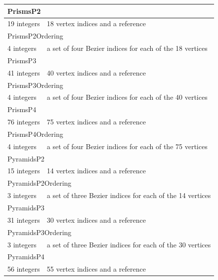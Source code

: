 \documentclass[a4paper,12pt]{article}
\begin{document}
\begin{longtable}{|m{4cm}|m{11cm}|}
\multicolumn{2}{|l|}{PrismsP2} \\
\hline
19 integers & 18 vertex indices and a reference \\
\hline\hline

\multicolumn{2}{|l|}{PrismsP2Ordering} \\
\hline
4 integers & a set of four Bezier indices for each of the 18 vertices \\
\hline\hline

\multicolumn{2}{|l|}{PrismsP3} \\
\hline
41 integers & 40 vertex indices and a reference \\
\hline\hline

\multicolumn{2}{|l|}{PrismsP3Ordering} \\
\hline
4 integers & a set of four Bezier indices for each of the 40 vertices \\
\hline\hline

\multicolumn{2}{|l|}{PrismsP4} \\
\hline
76 integers & 75 vertex indices and a reference \\
\hline\hline

\multicolumn{2}{|l|}{PrismsP4Ordering} \\
\hline
4 integers & a set of four Bezier indices for each of the 75 vertices \\
\hline\hline

\multicolumn{2}{|l|}{PyramidsP2} \\
\hline
15 integers & 14 vertex indices and a reference \\
\hline\hline

\multicolumn{2}{|l|}{PyramidsP2Ordering} \\
\hline
3 integers & a set of three Bezier indices for each of the 14 vertices \\
\hline\hline

\multicolumn{2}{|l|}{PyramidsP3} \\
\hline
31 integers & 30 vertex indices and a reference \\
\hline\hline

\multicolumn{2}{|l|}{PyramidsP3Ordering} \\
\hline
3 integers & a set of three Bezier indices for each of the 30 vertices \\
\hline\hline

\multicolumn{2}{|l|}{PyramidsP4} \\
\hline
56 integers & 55 vertex indices and a reference \\
\hline\hline


\end{longtable}
\end{document}

